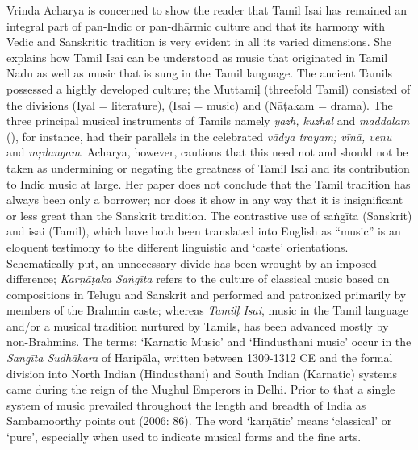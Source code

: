 Vrinda Acharya is concerned to show the reader that Tamil Isai has remained an integral part of pan-Indic or pan-dhārmic culture and that its harmony with Vedic and Sanskritic tradition is very evident in all its varied dimensions. She explains how Tamil Isai can be understood as music that originated in Tamil Nadu as well as music that is sung in the Tamil language. The ancient Tamils possessed a highly developed culture; the Muttamiḷ (threefold Tamil) consisted of the divisions (Iyal = literature), (Isai = music) and (Nāṭakam = drama). The three principal musical instruments of Tamils namely \textit{yazh, kuzhal} and \textit{maddalam} (), for instance, had their parallels in the celebrated \textit{vādya trayam; vīnā, veņu} and \textit{mŗdangam}. Acharya, however, cautions that this need not and should not be taken as undermining or negating the greatness of Tamil Isai and its contribution to Indic music at large. Her paper does not conclude that the Tamil tradition has always been only a borrower; nor does it show in any way that it is insignificant or less great than the Sanskrit tradition. The contrastive use of saṅgīta (Sanskrit) and isai (Tamil), which have both been translated into English as “music” is an eloquent testimony to the different linguistic and ‘caste’ orientations. Schematically put, an unnecessary divide has been wrought by an imposed difference; \textit{Karṇāṭaka Saṅgīta} refers to the culture of classical music based on compositions in Telugu and Sanskrit and performed and patronized primarily by members of the Brahmin caste; whereas \textit{Tamilḷ Isai}, music in the Tamil language and/or a musical tradition nurtured by Tamils, has been advanced mostly by non-Brahmins. The terms: ‘Karnatic Music’ and ‘Hindusthani music’ occur in the \textit{Sangīta Sudhākara} of Haripāla, written between 1309-1312 CE and the formal division into North Indian (Hindusthani) and South Indian (Karnatic) systems came during the reign of the Mughul Emperors in Delhi. Prior to that a single system of music prevailed throughout the length and breadth of India as Sambamoorthy points out (2006: 86). The word ‘karņātic’ means ‘classical’ or ‘pure’, especially when used to indicate musical forms and the fine arts.

